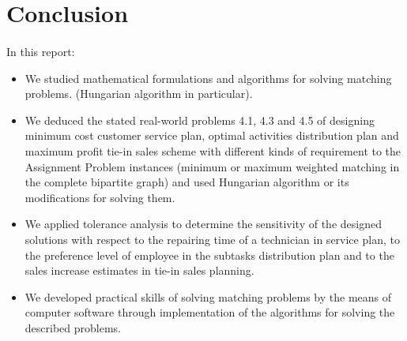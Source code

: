 \section{Conclusion}
	\paragraph{}
	In this report:
\begin{itemize}
	\item We studied mathematical formulations and algorithms for solving matching problems. (Hungarian algorithm in particular).
	\item We deduced the stated real-world problems 4.1, 4.3 and 4.5 of designing minimum cost customer service plan, optimal activities distribution plan and maximum profit tie-in sales scheme with different kinds of requirement to the Assignment Problem instances (minimum or maximum weighted matching in the complete bipartite graph) and used Hungarian algorithm or its modifications for solving them.
	\item We applied tolerance analysis to determine the sensitivity of the designed solutions with respect to the repairing time of a technician in service plan, to the preference level of employee in the subtasks distribution plan and to the sales increase estimates in tie-in sales planning.
	\item We developed practical skills of solving matching problems by the means of computer software through implementation of the algorithms for solving the described problems.
\end{itemize}
